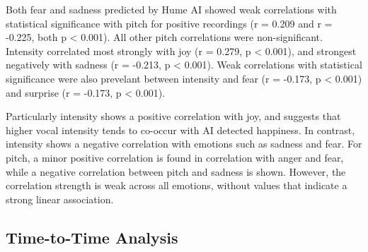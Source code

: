 Both fear and sadness predicted by Hume AI showed weak correlations with statistical significance with pitch for positive recordings (r = 0.209 and r = -0.225, both p < 0.001). All other pitch correlations were non-significant. 
Intensity correlated most strongly with joy (r = 0.279, p < 0.001), and strongest negatively with sadness (r = -0.213, p < 0.001). Weak correlations with statistical significance were also prevelant between intensity and fear (r = -0.173, p < 0.001) and surprise (r = -0.173, p < 0.001).

\medskip
Particularly intensity shows a positive correlation with joy, and suggests that higher vocal intensity tends to co-occur with AI detected happiness. In contrast, intensity shows a negative correlation with emotions such as sadness and fear.
For pitch, a minor positive correlation is found in correlation with anger and fear, while a negative correlation between pitch and sadness is shown.
However, the correlation strength is weak across all emotions, without values that indicate a strong linear association. 

\subsection{Time-to-Time Analysis}



